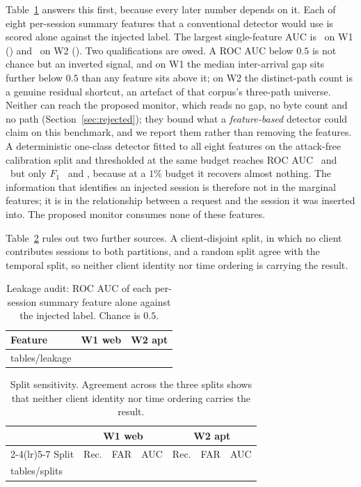 \documentclass[conference]{IEEEtran}
\makeatletter
\newcommand{\tabbody}[1]{\@@input #1 }
\makeatother
\begin{document}
Table~\ref{tab:leakage} answers this first, because every later number depends
on it.  Each of eight per-session summary features that a conventional detector
would use is scored alone against the injected label.  The largest single-feature
AUC is \margMaxWeb\ on W1 (\margMaxFeatWeb) and \margMaxApt\ on W2
(\margMaxFeatApt).  Two qualifications are owed.  A ROC AUC below $0.5$ is not
chance but an inverted signal, and on W1 the median inter-arrival gap sits
further below $0.5$ than any feature sits above it; on W2 the distinct-path count
is a genuine residual shortcut, an artefact of that corpus's three-path
universe.  Neither can reach the proposed monitor, which reads no gap, no byte
count and no path (Section~\ref{sec:rejected}); they bound what a
\emph{feature-based} detector could claim on this benchmark, and we report them
rather than removing the features.  A deterministic one-class
detector fitted to all eight features on the attack-free calibration split and
thresholded at the same budget reaches ROC AUC \contentAucWeb\ and
\contentAucApt\ but only $F_1$ \contentFoneWeb\ and \contentFoneApt, because at
a $1\%$ budget it recovers almost nothing.  The information that identifies an
injected session is therefore not in the marginal features; it is in the
relationship between a request and the session it was inserted into.  The
proposed monitor consumes none of these features.

Table~\ref{tab:splits} rules out two further sources.  A client-disjoint split,
in which no client contributes sessions to both partitions, and a random split
agree with the temporal split, so neither client identity nor time ordering is
carrying the result.

\begin{table}[t]
\caption{Leakage audit: ROC AUC of each per-session summary feature alone
against the injected label. Chance is $0.5$.}
\label{tab:leakage}
\centering\footnotesize
\begin{tabular}{lrr}
\toprule
Feature & W1 web & W2 apt\\
\midrule
\tabbody{tables/leakage}
\bottomrule
\end{tabular}
\end{table}

\begin{table}[t]
\caption{Split sensitivity. Agreement across the three splits shows that
neither client identity nor time ordering carries the result.}
\label{tab:splits}
\centering\footnotesize
\begin{tabular}{lrrrrrr}
\toprule
& \multicolumn{3}{c}{W1 web} & \multicolumn{3}{c}{W2 apt}\\
\cmidrule(lr){2-4}\cmidrule(lr){5-7}
Split & Rec. & FAR & AUC & Rec. & FAR & AUC\\
\midrule
\tabbody{tables/splits}
\bottomrule
\end{tabular}
\end{table}
\end{document}
